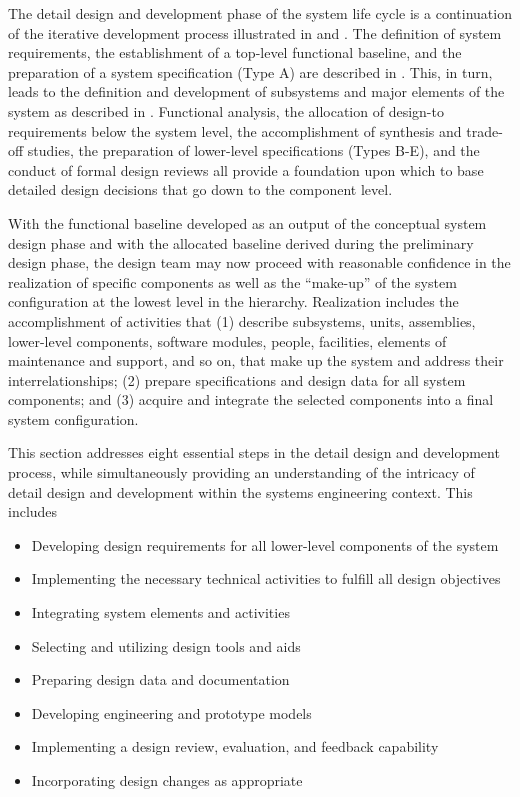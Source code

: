 The detail design and development phase of the system life cycle is a continuation of the iterative development process illustrated in  and . The definition of system requirements, the establishment of a top-level functional baseline, and the preparation of a system specification (Type A) are described in . This, in turn, leads to the definition and development of subsystems and major elements of the system as described in . Functional analysis, the allocation of design-to requirements below the system level, the accomplishment of synthesis and trade-off studies, the preparation of lower-level specifications (Types B-E), and the conduct of formal design reviews all provide a foundation upon which to base detailed design decisions that go down to the component level.

With the functional baseline developed as an output of the conceptual system design phase and with the allocated baseline derived during the preliminary design phase, the design team may now proceed with reasonable confidence in the realization of specific components as well as the ``make-up'' of the system configuration at the lowest level in the hierarchy. Realization includes the accomplishment of activities that (1) describe subsystems, units, assemblies, lower-level components, software modules, people, facilities, elements of maintenance and support, and so on, that make up the system and address their interrelationships; (2) prepare specifications and design data for all system components; and (3) acquire and integrate the selected components into a final system configuration.

This section addresses eight essential steps in the detail design and development process, while simultaneously providing an understanding of the intricacy of detail design and development within the systems engineering context. This includes

\begin{itemize}
\item Developing design requirements for all lower-level components of the system
\item Implementing the necessary technical activities to fulfill all design objectives
\item Integrating system elements and activities
\item Selecting and utilizing design tools and aids
\item Preparing design data and documentation
\item Developing engineering and prototype models
\item Implementing a design review, evaluation, and feedback capability
\item Incorporating design changes as appropriate
\end{itemize}

